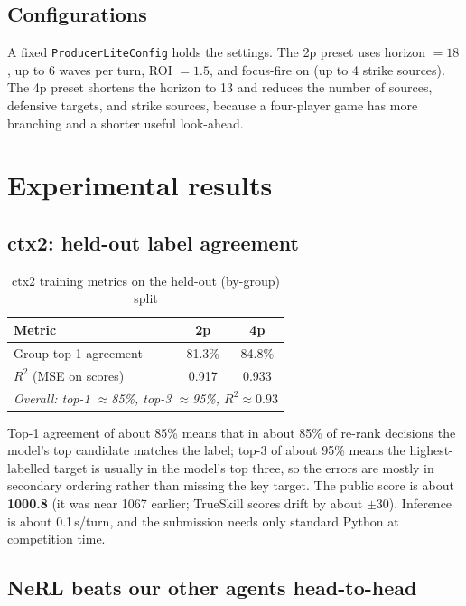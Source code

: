 \documentclass[conference]{IEEEtran}
\begin{document}
\subsection{Configurations}
A fixed \texttt{ProducerLiteConfig} holds the settings. The 2p preset uses horizon $=18$, up to 6 waves per turn, ROI $=1.5$, and focus-fire on (up to 4 strike sources). The 4p preset shortens the horizon to 13 and reduces the number of sources, defensive targets, and strike sources, because a four-player game has more branching and a shorter useful look-ahead.

\section{Experimental results}
\label{sec:results}

\subsection{ctx2: held-out label agreement}

\begin{table}[htbp]
\caption{ctx2 training metrics on the held-out (by-group) split}
\label{tab:metrics}
\centering
\begin{tabular}{lcc}
\toprule
\textbf{Metric} & \textbf{2p} & \textbf{4p} \\
\midrule
Group top-1 agreement & 81.3\% & 84.8\% \\
$R^2$ (MSE on scores) & 0.917 & 0.933 \\
\midrule
\multicolumn{3}{l}{\textit{Overall: top-1 $\approx$85\%, top-3 $\approx$95\%, $R^2 \approx 0.93$}} \\
\bottomrule
\end{tabular}
\end{table}

Top-1 agreement of about 85\% means that in about 85\% of re-rank decisions the model's top candidate matches the label; top-3 of about 95\% means the highest-labelled target is usually in the model's top three, so the errors are mostly in secondary ordering rather than missing the key target. The public score is about \textbf{1000.8} (it was near 1067 earlier; TrueSkill scores drift by about $\pm 30$). Inference is about 0.1\,s/turn, and the submission needs only standard Python at competition time.

\subsection{NeRL beats our other agents head-to-head}
\end{document}
